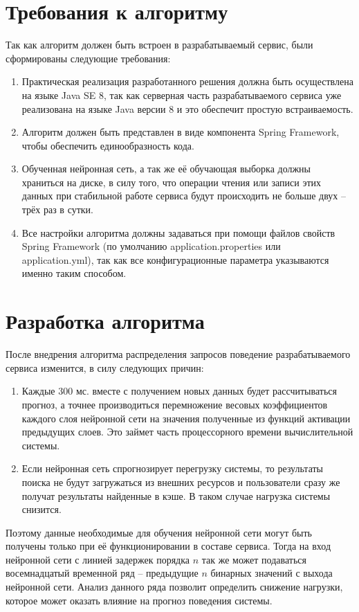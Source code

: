 \documentclass[a4paper,14pt,russian]{extreport}
\begin{document}
\section{Требования к алгоритму}
Так как алгоритм должен быть встроен в разрабатываемый сервис, были 
сформированы следующие требования:
\begin{enumerate}
	\item Практическая реализация разработанного решения должна быть 
		осуществлена на языке Java SE 8, так как серверная часть 
		разрабатываемого сервиса уже реализована на языке Java версии 8 и 
		это обеспечит простую встраиваемость.
	\item Алгоритм должен быть представлен в виде компонента Spring 
		Framework, чтобы обеспечить единообразность кода.
	\item Обученная нейронная сеть, а так же её обучающая выборка должны 
		храниться на диске, в силу того, что операции чтения или записи этих 
		данных при стабильной работе сервиса будут происходить не больше  
		двух -- трёх раз в сутки.
	\item Все настройки алгоритма должны задаваться при помощи файлов 
		свойств Spring Framework (по умолчанию application.properties или 
		application.yml), так как все конфигурационные параметра указываются 
		именно таким способом.
\end{enumerate}

\section{Разработка алгоритма} \label{sec:algdevelopment}
После внедрения алгоритма распределения запросов поведение 
разрабатываемого сервиса изменится, в силу следующих причин:
\begin{enumerate}
	\item Каждые 300 мс. вместе с получением новых данных будет 
		рассчитываться прогноз, а точнее производиться перемножение 
		весовых коэффициентов каждого слоя нейронной сети на значения 
		полученные из функций активации предыдущих слоев. Это займет 
		часть процессорного времени вычислительной системы.
	\item Если нейронная сеть спрогнозирует перегрузку системы, то 
		результаты поиска не будут загружаться из внешних ресурсов и 
		пользователи сразу же получат результаты найденные в кэше. В 
		таком случае нагрузка системы снизится. 
\end{enumerate}
Поэтому данные необходимые для обучения нейронной сети могут быть 
получены только при её функционировании в составе сервиса. Тогда 
на вход нейронной сети с линией задержек порядка $n$ так же может 
подаваться восемнадцатый временной ряд -- предыдущие $n$ бинарных 
значений с выхода нейронной сети. Анализ данного ряда позволит определить 
снижение нагрузки, которое может оказать влияние на прогноз поведения 
системы. 
\end{document}
